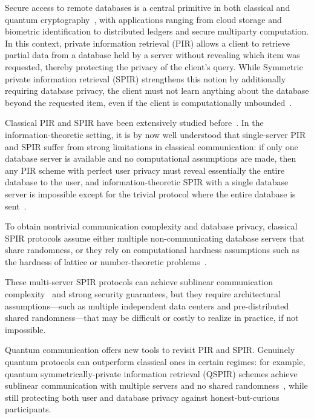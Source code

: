 \documentclass[%
 reprint,
superscriptaddress,
 amsmath,amssymb,
 aps,
]{revtex4-2}
\begin{document}
Secure access to remote databases is a central primitive in both classical and quantum cryptography~\cite{QPQ1, QPQ2, QPQ3, QSPIR_multiple_database1, QSPIR_multiple_database2, Insecurity_Quantum_Oblivious_transfer1}, with applications ranging from cloud storage and biometric identification to distributed ledgers and secure multiparty computation. In this context, private information retrieval (PIR) allows a client to retrieve partial data from a database held by a server without revealing which item was requested, thereby protecting the privacy of the client’s query. While Symmetric private information retrieval (SPIR) strengthens this notion by additionally requiring database privacy, the client must not learn anything about the database beyond the requested item, even if the client is computationally unbounded~\cite{QSPIR_theory1, QSPIR_multiple_database1, QSPIR_multiple_database2, SPIR1, SPIR2, SPIR3}.

Classical PIR and SPIR have been extensively studied before~\cite{PIR1, PIR2, PIR3, SPIR1, SPIR2, SPIR3}. In the information-theoretic setting, it is by now well understood that single-server PIR and SPIR suffer from strong limitations in classical communication: if only one database server is available and no computational assumptions are made, then any PIR scheme with perfect user privacy must reveal essentially the entire database to the user, and information-theoretic SPIR with a single database server is impossible except for the trivial protocol where the entire database is sent~\cite{PIR1, PIR2}.


To obtain nontrivial communication complexity and database privacy, classical SPIR protocols assume either multiple non-communicating database servers that share randomness, or they rely on computational hardness assumptions such as the hardness of lattice or number-theoretic problems~\cite{SPIR1, SPIR2, SPIR3}.

These multi-server SPIR protocols can achieve sublinear communication complexity~\cite{SPIR1, SPIR2, SPIR3} and strong security guarantees, but they require architectural assumptions—such as multiple independent data centers and pre-distributed shared randomness—that may be difficult or costly to realize in practice, if not impossible.

Quantum communication offers new tools to revisit PIR and SPIR. Genuinely quantum protocols can outperform classical ones in certain regimes: for example, quantum symmetrically-private information retrieval (QSPIR) schemes achieve sublinear communication with multiple servers and no shared randomness~\cite{QSPIR_multiple_database1, QSPIR_multiple_database2}, while still protecting both user and database privacy against honest-but-curious participants.
\end{document}
